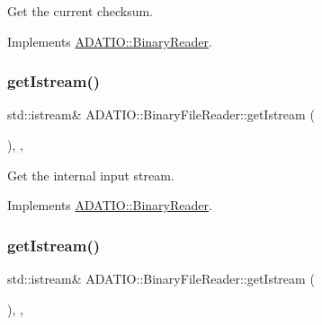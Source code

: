 Get the current checksum. 



Implements \mbox{\hyperlink{classADATIO_1_1BinaryReader_acd705bb96d557a5437410b55beb40bda}{A\+D\+A\+T\+I\+O\+::\+Binary\+Reader}}.

\mbox{\label{classADATIO_1_1BinaryFileReader_ae0985a1157f9baa87580606cfcf98908}} 
\subsubsection{\texorpdfstring{getIstream()}{getIstream()}\hspace{0.1cm}{\footnotesize\ttfamily [1/3]}}
{\footnotesize\ttfamily std\+::istream\& A\+D\+A\+T\+I\+O\+::\+Binary\+File\+Reader\+::get\+Istream (\begin{DoxyParamCaption}{ }\end{DoxyParamCaption})\hspace{0.3cm}{\ttfamily [inline]}, {\ttfamily [protected]}, {\ttfamily [virtual]}}



Get the internal input stream. 



Implements \mbox{\hyperlink{classADATIO_1_1BinaryReader_aa34e73d5f1e6b2b3b48c27e97f6a85a0}{A\+D\+A\+T\+I\+O\+::\+Binary\+Reader}}.

\mbox{\label{classADATIO_1_1BinaryFileReader_ae0985a1157f9baa87580606cfcf98908}} 
\subsubsection{\texorpdfstring{getIstream()}{getIstream()}\hspace{0.1cm}{\footnotesize\ttfamily [2/3]}}
{\footnotesize\ttfamily std\+::istream\& A\+D\+A\+T\+I\+O\+::\+Binary\+File\+Reader\+::get\+Istream (\begin{DoxyParamCaption}{ }\end{DoxyParamCaption})\hspace{0.3cm}{\ttfamily [inline]}, {\ttfamily [protected]}, {\ttfamily [virtual]}}



